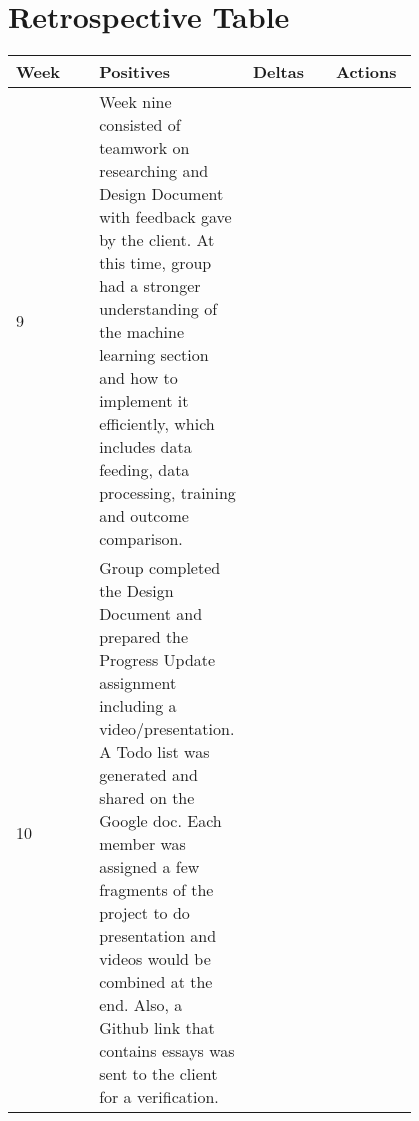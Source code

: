 \documentclass[10pt,journal,compsoc, draftclsnofoot,onecolumn]{IEEEtran}
\begin{document}
\section{Retrospective Table}
\begin{center}
 \begin{tabular}{|p{0.2\linewidth}|p{0.2\linewidth}|p{0.2\linewidth}|p{0.2\linewidth}|}
  \hline
 Week & Positives & Deltas & Actions \\ [0.5ex]
 \hline\hline

9
&
Week nine consisted of teamwork on researching and Design Document with feedback gave by the client.
At this time, group had a stronger understanding of the machine learning section and how to implement it efficiently, which includes data feeding, data processing, training and outcome comparison. 
&

&

\\ \hline

10
&
Group completed the Design Document and prepared the Progress Update assignment including a video/presentation.
A Todo list was generated and shared on the Google doc.
Each member was assigned a few fragments of the project to do presentation and videos would be combined at the end.
Also, a Github link that contains essays was sent to the client for a verification. 
&

&

\\ \hline

 
 
 
 
 
 \end{tabular}
\end{center}


\newpage
\nocite{*}%


\end{document}
